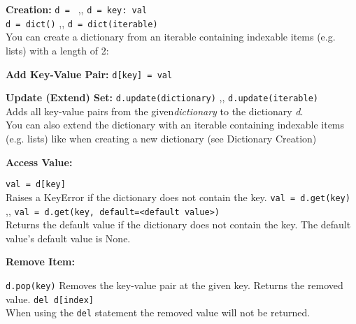        \begin{indentblock}
            \textbf{Creation:} \texttt{d = {}} \sep{,}
            \texttt{d = {key: val}} \\
            \texttt{d = dict()} \sep{,} \texttt{d = dict(iterable)} \\
            You can create a dictionary from an iterable containing indexable items (e.g. lists)
            with a length of 2:


            \textbf{Add Key-Value Pair:} \texttt{d[key] = val}

            \textbf{Update (Extend) Set:} \texttt{d.update(dictionary)} \sep{,}
            \texttt{d.update(iterable)} \\
            Adds all key-value pairs from the given\textit{dictionary} to the dictionary
            \textit{d}.\\
            You can also extend the dictionary with an iterable containing indexable items
            (e.g. lists) like when creating a new dictionary (see Dictionary Creation)

            \textbf{Access Value:}
            \begin{itemize}
                 \texttt{val = d[key]} \\
                Raises a KeyError if the dictionary does not contain the key.
                 \texttt{val = d.get(key)} \sep{,}
                \texttt{val = d.get(key, default=<default value>)} \\
                Returns the default value if the dictionary does not contain the key.
                The default value's default value is None.
            \end{itemize}

            \textbf{Remove Item:}
            \begin{itemize}
                 \texttt{d.pop(key)}
                Removes the key-value pair at the given key. Returns the removed value.
                 \texttt{del d[index]} \\
                When using the \texttt{del} statement the removed value will not be
                returned.
            \end{itemize}


\end{indentblock}
